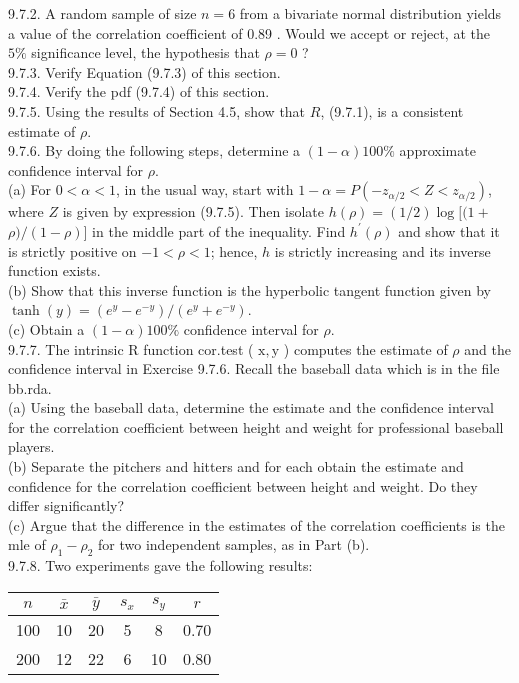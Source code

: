 9.7.2. A random sample of size $n=6$ from a bivariate normal distribution yields a value of the correlation coefficient of 0.89 . Would we accept or reject, at the $5 \%$ significance level, the hypothesis that $\rho=0$ ?\\
9.7.3. Verify Equation (9.7.3) of this section.\\
9.7.4. Verify the pdf (9.7.4) of this section.\\
9.7.5. Using the results of Section 4.5, show that $R$, (9.7.1), is a consistent estimate of $\rho$.\\
9.7.6. By doing the following steps, determine a $(1-\alpha) 100 \%$ approximate confidence interval for $\rho$.\\
(a) For $0<\alpha<1$, in the usual way, start with $1-\alpha=P\left(-z_{\alpha / 2}<Z<z_{\alpha / 2}\right)$, where $Z$ is given by expression (9.7.5). Then isolate $h(\rho)=(1 / 2) \log [(1+$ $\rho) /(1-\rho)]$ in the middle part of the inequality. Find $h^{\prime}(\rho)$ and show that it is strictly positive on $-1<\rho<1$; hence, $h$ is strictly increasing and its inverse function exists.\\
(b) Show that this inverse function is the hyperbolic tangent function given by $\tanh (y)=\left(e^{y}-e^{-y}\right) /\left(e^{y}+e^{-y}\right)$.\\
(c) Obtain a $(1-\alpha) 100 \%$ confidence interval for $\rho$.\\
9.7.7. The intrinsic R function cor.test ( $\mathrm{x}, \mathrm{y}$ ) computes the estimate of $\rho$ and the confidence interval in Exercise 9.7.6. Recall the baseball data which is in the file bb.rda.\\
(a) Using the baseball data, determine the estimate and the confidence interval for the correlation coefficient between height and weight for professional baseball players.\\
(b) Separate the pitchers and hitters and for each obtain the estimate and confidence for the correlation coefficient between height and weight. Do they differ significantly?\\
(c) Argue that the difference in the estimates of the correlation coefficients is the mle of $\rho_{1}-\rho_{2}$ for two independent samples, as in Part (b).\\
9.7.8. Two experiments gave the following results:

\begin{center}
\begin{tabular}{cccccc}
\hline
$n$ & $\bar{x}$ & $\bar{y}$ & $s_{x}$ & $s_{y}$ & $r$ \\
\hline
100 & 10 & 20 & 5 & 8 & 0.70 \\
200 & 12 & 22 & 6 & 10 & 0.80 \\
\hline
\end{tabular}
\end{center}

